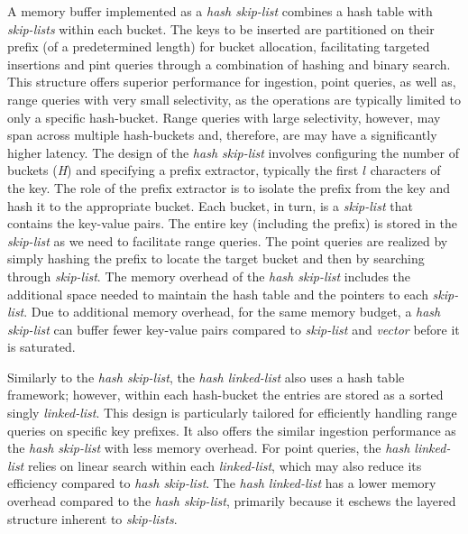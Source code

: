 A memory buffer implemented as a \textit{hash skip-list} combines a hash table with \textit{skip-lists} within each bucket. 
The keys to be inserted are partitioned on their prefix (of a predetermined length) for bucket allocation, facilitating targeted insertions and pint queries through a combination of 
hashing and binary search. 
This structure offers superior performance for ingestion, point queries, as well as, range 
queries with very small selectivity, as the operations are typically limited to only a specific hash-bucket. 
Range queries with large selectivity, however, may span across multiple hash-buckets and, therefore, are may have a significantly higher latency.  
The design of the \textit{hash skip-list} involves configuring the number of buckets (\textit{H}) and specifying a prefix extractor, typically the first $l$ characters of the key. 
The role of the prefix extractor is to isolate the prefix from the key and hash it to the appropriate bucket. 
Each bucket, in turn, is a \textit{skip-list} that contains the key-value pairs. 
The entire key (including the prefix) is stored in the \textit{skip-list} as we need to facilitate range queries. 
The point queries are realized by simply hashing the prefix to locate the target bucket and then by searching through \textit{skip-list}. 
The memory overhead of the \textit{hash skip-list} includes the additional space needed to maintain the hash table and the pointers to each \textit{skip-list}. 
Due to additional memory overhead, for the same memory budget, a \textit{hash skip-list} can buffer fewer key-value pairs compared to \textit{skip-list} and \textit{vector} before it is saturated. 

Similarly to the \textit{hash skip-list}, the \textit{hash linked-list} also uses a hash table framework; however, within each hash-bucket the entries are stored as a sorted singly \textit{linked-list}. 
This design is particularly tailored for efficiently handling range queries on specific key prefixes. 
It also offers the similar ingestion performance as the \textit{hash skip-list} with less memory overhead. 
For point queries, the \textit{hash linked-list} relies on linear search within each \textit{linked-list}, which may also reduce its efficiency compared to \textit{hash skip-list}. 
The \textit{hash linked-list} has a lower memory overhead compared to the \textit{hash skip-list}, primarily because it eschews the layered structure inherent to 
\textit{skip-lists}. 

